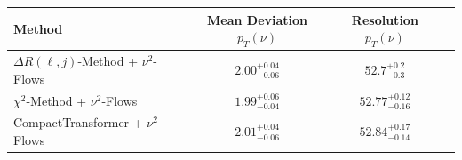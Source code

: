     \begin{tabular}{lccc}
        \toprule
        Method & Mean Deviation $p_{T}({\nu})$ & Resolution $p_{T}({\nu})$ \\
        \midrule
        $\Delta R(\ell,j)$-Method + $\nu^2$-Flows & $2.00^{+0.04}_{-0.06}$ & $52.7^{+0.2}_{-0.3}$ \\
        $\chi^2$-Method + $\nu^2$-Flows & $1.99^{+0.06}_{-0.04}$ & $52.77^{+0.12}_{-0.16}$ \\
        CompactTransformer + $\nu^2$-Flows & $2.01^{+0.04}_{-0.06}$ & $52.84^{+0.17}_{-0.14}$ \\
        \bottomrule
    \end{tabular}